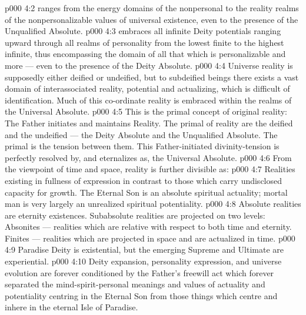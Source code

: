 \vs p000 4:2 \bibnobreakspace {} ranges from the energy domains of the nonpersonal to the reality realms of the nonpersonalizable values of universal existence, even to the presence of the Unqualified Absolute.
\vs p000 4:3 \bibnobreakspace {} embraces all infinite Deity potentials ranging upward through all realms of personality from the lowest finite to the highest infinite, thus encompassing the domain of all that which is personalizable and more --- even to the presence of the Deity Absolute.
\vs p000 4:4 \bibnobreakspace {} Universe reality is supposedly either deified or undeified, but to subdeified beings there exists a vast domain of interassociated reality, potential and actualizing, which is difficult of identification. Much of this co\hyp{}ordinate reality is embraced within the realms of the Universal Absolute.
\vs p000 4:5 This is the primal concept of original reality: The Father initiates and maintains Reality. The primal  of reality are the deified and the undeified --- the Deity Absolute and the Unqualified Absolute. The primal  is the tension between them. This Father\hyp{}initiated divinity\hyp{}tension is perfectly resolved by, and eternalizes as, the Universal Absolute.
\vs p000 4:6 \pc From the viewpoint of time and space, reality is further divisible as:
\vs p000 4:7 \bibnobreakspace {} Realities existing in fullness of expression in contrast to those which carry undisclosed capacity for growth. The Eternal Son is an absolute spiritual actuality; mortal man is very largely an unrealized spiritual potentiality.
\vs p000 4:8 \bibnobreakspace {} Absolute realities are eternity existences. Subabsolute realities are projected on two levels: Absonites --- realities which are relative with respect to both time and eternity. Finites --- realities which are projected in space and are actualized in time.
\vs p000 4:9 \bibnobreakspace {} Paradise Deity is existential, but the emerging Supreme and Ultimate are experiential.
\vs p000 4:10 \bibnobreakspace {} Deity expansion, personality expression, and universe evolution are forever conditioned by the Father’s freewill act which forever separated the mind\hyp{}spirit\hyp{}personal meanings and values of actuality and potentiality centring in the Eternal Son from those things which centre and inhere in the eternal Isle of Paradise.

